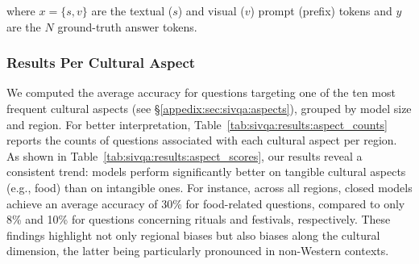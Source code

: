 where $x = \{s, v\}$ are the textual ($s$) and visual ($v$) prompt (prefix) tokens and $y$ are the $N$ ground-truth answer tokens.


\subsubsection*{Results Per Cultural Aspect}
\label{sec:appendix:sec:analyses:sivqa:results:aspects}
%
We computed the average accuracy for questions targeting one of the ten most frequent cultural aspects (see \S\ref{appedix:sec:sivqa:aspects}), grouped by model size and region.
%
For better interpretation, Table~\ref{tab:sivqa:results:aspect_counts} reports the counts of questions associated with each cultural aspect per region.
%
As shown in Table~\ref{tab:sivqa:results:aspect_scores}, our results reveal a consistent trend: models perform significantly better on tangible cultural aspects (e.g., food) than on intangible ones.
%
For instance, across all regions, closed models achieve an average accuracy of 30\% for food-related questions, compared to only 8\% and 10\% for questions concerning rituals and festivals, respectively.
%
These findings highlight not only regional biases but also biases along the cultural dimension, the latter being particularly pronounced in non-Western contexts.
%

%

%
\begin{table}[ht]
    \centering
    \caption{Number of questions targeting one of the top-10 cultural aspects per region in \sivqa.}
    \label{tab:sivqa:results:aspect_counts}
\end{table}
%

